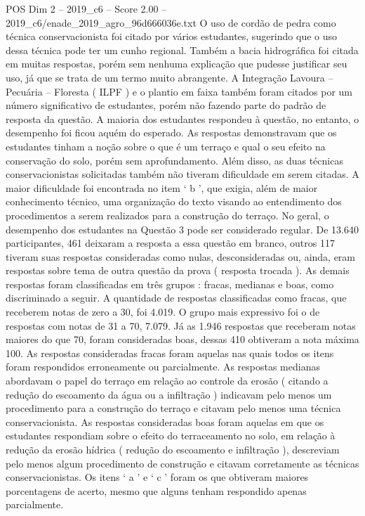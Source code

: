 \begin{textsample}{POS Dim 2 – 2019\_c6 – Score 2.00 – 2019\_c6/enade\_2019\_agro\_96d666036e.txt}
O uso de cordão de pedra como técnica conservacionista foi citado por vários estudantes, sugerindo que o uso dessa técnica pode ter um cunho regional.
Também a bacia hidrográfica foi citada em muitas respostas, porém sem nenhuma explicação que pudesse justificar seu uso, já que se trata de um termo muito abrangente.
A Integração Lavoura – Pecuária – Floresta ( ILPF ) e o plantio em faixa também foram citados por um número significativo de estudantes, porém não fazendo parte do padrão de resposta da questão.
A maioria dos estudantes respondeu à questão, no entanto, o desempenho foi ficou aquém do esperado.
As respostas demonstravam que os estudantes tinham a noção sobre o que é um terraço e qual o seu efeito na conservação do solo, porém sem aprofundamento.
Além disso, as duas técnicas conservacionistas solicitadas também não tiveram dificuldade em serem citadas.
A maior dificuldade foi encontrada no item ‘ b ’, que exigia, além de maior conhecimento técnico, uma organização do texto visando ao entendimento dos procedimentos a serem realizados para a construção do terraço.
No geral, o desempenho dos estudantes na Questão 3 pode ser considerado regular.
De 13.640 participantes, 461 deixaram a resposta a essa questão em branco, outros 117 tiveram suas respostas consideradas como nulas, desconsideradas ou, ainda, eram respostas sobre tema de outra questão da prova ( resposta trocada ).
As demais respostas foram classificadas em três grupos : fracas, medianas e boas, como discriminado a seguir.
A quantidade de respostas classificadas como fracas, que receberem notas de zero a 30, foi 4.019.
O grupo mais expressivo foi o de respostas com notas de 31 a 70, 7.079.
Já as 1.946 respostas que receberam notas maiores do que 70, foram consideradas boas, dessas 410 obtiveram a nota máxima 100.
As respostas consideradas fracas foram aquelas nas quais todos os itens foram respondidos erroneamente ou parcialmente.
As respostas medianas abordavam o papel do terraço em relação ao controle da erosão ( citando a redução do escoamento da água ou a infiltração ) indicavam pelo menos um procedimento para a construção do terraço e citavam pelo menos uma técnica conservacionista.
As respostas consideradas boas foram aquelas em que os estudantes respondiam sobre o efeito do terraceamento no solo, em relação à redução da erosão hídrica ( redução do escoamento e infiltração ), descreviam pelo menos algum procedimento de construção e citavam corretamente as técnicas conservacionistas.
Os itens ‘ a ’ e ‘ c ’ foram os que obtiveram maiores porcentagens de acerto, mesmo que alguns tenham respondido apenas parcialmente.

\end{textsample}
